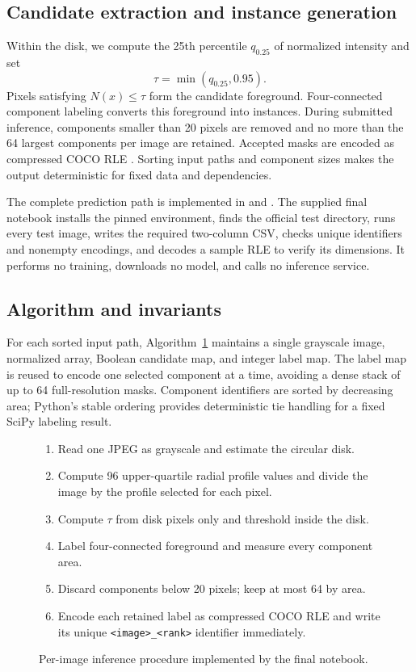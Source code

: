 \documentclass[sigconf]{acmart}
\begin{document}
\subsection{Candidate extraction and instance generation}
Within the disk, we compute the 25th percentile $q_{0.25}$ of normalized
intensity and set
\begin{equation}
  \tau=\min(q_{0.25},0.95).
\end{equation}
Pixels satisfying $N(x)\leq\tau$ form the candidate foreground. Four-connected
component labeling converts this foreground into instances. During submitted
inference, components smaller than 20 pixels are removed and no more than the
64 largest components per image are retained. Accepted masks are encoded as
compressed COCO RLE \cite{lin2014coco}. Sorting input paths and component sizes
makes the output deterministic for fixed data and dependencies.

The complete prediction path is implemented in  and
. The supplied final notebook installs the pinned
environment, finds the official test directory, runs every test image, writes
the required two-column CSV, checks unique identifiers and nonempty encodings,
and decodes a sample RLE to verify its dimensions. It performs no training,
downloads no model, and calls no inference service.

\subsection{Algorithm and invariants}
For each sorted input path, Algorithm~\ref{alg:inference} maintains a single
grayscale image, normalized array, Boolean candidate map, and integer label map.
The label map is reused to encode one selected component at a time, avoiding a
dense stack of up to 64 full-resolution masks.  Component identifiers are sorted
by decreasing area; Python's stable ordering provides deterministic tie handling
for a fixed SciPy labeling result.

\begin{figure}[h]
\small
\begin{enumerate}
  \item Read one JPEG as grayscale and estimate the circular disk.
  \item Compute 96 upper-quartile radial profile values and divide the image by
        the profile selected for each pixel.
  \item Compute $\tau$ from disk pixels only and threshold inside the disk.
  \item Label four-connected foreground and measure every component area.
  \item Discard components below 20 pixels; keep at most 64 by area.
  \item Encode each retained label as compressed COCO RLE and write its unique
        \texttt{<image>\_<rank>} identifier immediately.
\end{enumerate}
\caption{Per-image inference procedure implemented by the final notebook.}
\label{alg:inference}
\end{figure}
\end{document}
